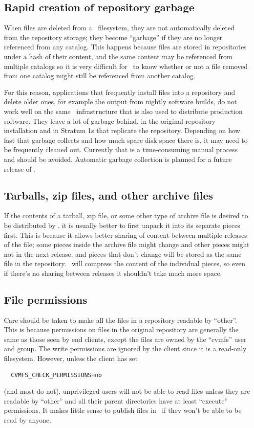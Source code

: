 \subsection{Rapid creation of repository garbage}
When files are deleted from a \cvmfs\ filesystem, they are not automatically deleted from the repository storage; they become ``garbage'' if they are no longer referenced from any catalog.
This happens because files are stored in repositories under a hash of their content, and the same content may be referenced from multiple catalogs so it is very difficult for \cvmfs\ to know whether or not a file removed from one catalog might still be referenced from another catalog.

For this reason, applications that frequently install files into a repository and delete older ones, for example the output from nightly software builds, do not work well on the same \cvmfs\ infrastructure that is also used to distribute production software.
They leave a lot of garbage behind, in the original repository installation and in Stratum 1s that replicate the repository.
Depending on how fast that garbage collects and how much spare disk space there is, it may need to be frequently cleaned out.
Currently that is a time-consuming manual process and should be avoided.
Automatic garbage collection is planned for a future release of \cvmfs.

\subsection{Tarballs, zip files, and other archive files}
If the contents of a tarball, zip file, or some other type of archive file is desired to be distributed by \cvmfs, it is usually better to first unpack it into its separate pieces first.
This is because it allows better sharing of content between multiple releases of the file;
some pieces inside the archive file might change and other pieces might not in the next release, and pieces that don't change will be stored as the same file in the repository.
\cvmfs\ will compress the content of the individual pieces, so even if there's no sharing between releases it shouldn't take much more space.

\subsection{File permissions}
Care should be taken to make all the files in a repository readable by ``other''.
This is because permissions on files in the original repository are generally the same as those seen by end clients, except the files are owned by the ``cvmfs'' user and group.
The write permissions are ignored by the client since it is a read-only filesystem.
However, unless the client has set
\begin{verbatim}
  CVMFS_CHECK_PERMISSIONS=no
\end{verbatim}
(and most do not), unprivileged users will not be able to read files unless they are readable by ``other'' and all their parent directories have at least ``execute'' permissions.
It makes little sense to publish files in \cvmfs\ if they won't be able to be read by anyone.

